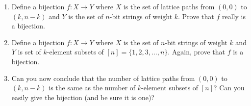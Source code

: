 \documentclass{book}
\begin{document}
\setcounter{cpjt}{70}
\addtocounter{cpjt}{-1}
\begin{activity}\label{activity-63}
\leavevmode%
\begin{enumerate}[font=\bfseries,label=(\alph*),ref=\alph*]
\item\label{task-95} \hypertarget{p-520}{}%
Define a bijection \(f:X \to Y\) where \(X\) is the set of lattice paths from \((0,0)\) to \((k,n-k)\) and \(Y\) is the set of \(n\)-bit strings of weight \(k\). Prove that \(f\) really is a bijection.%
\item\label{task-96} \hypertarget{p-521}{}%
Define a bijection \(f:X \to Y\) where \(X\) is the set of \(n\)-bit strings of weight \(k\) and \(Y\) is set of \(k\)-element subsets of \([n] = \{1,2,3,\ldots, n\}\).  Again, prove that \(f\) is a bijection.%
\item\label{task-97} \hypertarget{p-522}{}%
Can you now conclude that the number of lattice paths from \((0,0)\) to \((k,n-k)\) is the same as the number of \(k\)-element subsets of \([n]\)?  Can you easily give the bijection (and be sure it is one)?%
\end{enumerate}
\end{activity}

\clearpage
\end{document}
